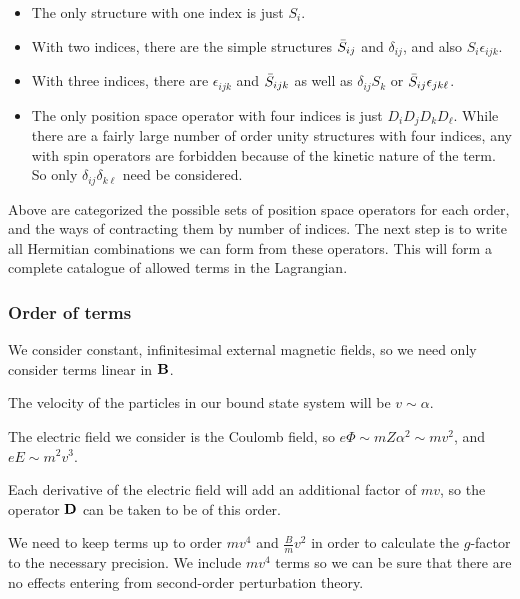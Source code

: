 \begin{itemize}
\item The only structure with one index is just $S_i$.

\item With two indices, there are the simple structures $\bar{S}_{ij}$ and $\delta_{ij}$, and also $S_i \epsilon_{ijk}$.

\item With three indices, there are $\epsilon_{ijk}$ and $\bar{S}_{ijk}$ as well as $\delta_{ij} S_k$ or $\bar{S}_{ij} \epsilon_{jk\ell}$.

\item The only position space operator with four indices is just $D_i D_j D_k D_\ell$.  While there are a fairly large number of order unity structures with four indices, any with spin operators are forbidden because of the kinetic nature of the term.  So only $\delta_{ij} \delta_{k\ell}$ need be considered.
\end{itemize}

Above are categorized the possible sets of position space operators for each order, and the ways of contracting them by number of indices.  The next step is to write all Hermitian combinations we can form from these operators.  This will form a complete catalogue of allowed terms in the Lagrangian.

 



\subsubsection{Order of terms}
We consider constant, infinitesimal external magnetic fields, so we need only consider terms linear in $\mathbf{B}$.

The velocity of the particles in our bound state system will be $v \sim \alpha$.

The electric field we consider is the Coulomb field, so $e\Phi \sim m Z\alpha^2 \sim mv^2$, and $eE \sim m^2v^3$.

Each derivative of the electric field will add an additional factor of $mv$, so the operator $\mathbf{D}$ can be taken to be of this order.

We need to keep terms up to order $mv^4$ and $\frac{B}{m} v^2$ in order to calculate the $g$-factor to the necessary precision.  We include $mv^4$ terms so we can be sure that there are no effects entering from second-order perturbation theory.


